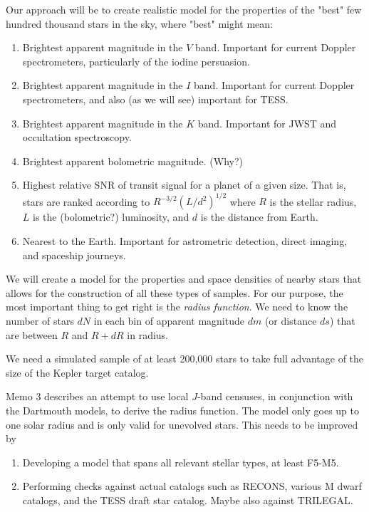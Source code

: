 \documentclass{emulateapj}
\begin{document}
Our approach will be to create realistic model for the properties of
the "best" few hundred thousand stars in the sky, where "best" might
mean:

\begin{enumerate}

\item Brightest apparent magnitude in the $V$ band.  Important for
  current Doppler spectrometers, particularly of the iodine
  persuasion.

\item Brightest apparent magnitude in the $I$ band.  Important for
  current Doppler spectrometers, and also (as we will see) important
  for TESS.

\item Brightest apparent magnitude in the $K$ band. Important for JWST
  and occultation spectroscopy.

\item Brightest apparent bolometric magnitude. (Why?)

\item Highest relative SNR of transit signal for a planet of a given
  size. That is, stars are ranked according to $R^{-3/2}
  (L/d^2)^{1/2}$ where $R$ is the stellar radius, $L$ is the
  (bolometric?) luminosity, and $d$ is the distance from Earth.

\item Nearest to the Earth. Important for astrometric detection, direct
  imaging, and spaceship journeys.

\end{enumerate}

We will create a model for the properties and space densities of
nearby stars that allows for the construction of all these types of
samples. For our purpose, the most important thing to get right is the
{\it radius function}. We need to know the number of stars $dN$ in
each bin of apparent magnitude $dm$ (or distance $ds$) that are
between $R$ and $R+dR$ in radius.

We need a simulated sample of at least 200,000 stars to take full
advantage of the size of the Kepler target catalog.

Memo 3 describes an attempt to use local $J$-band censuses, in
conjunction with the Dartmouth models, to derive the radius function.
The model only goes up to one solar radius and is only valid for
unevolved stars. This needs to be improved by
\begin{enumerate}
\item Developing a model that spans all relevant stellar types, at
  least F5-M5.
\item Performing checks against actual catalogs such as RECONS,
  various M dwarf catalogs, and the TESS draft star catalog. Maybe
  also against TRILEGAL.
\end{enumerate}
\end{document}
